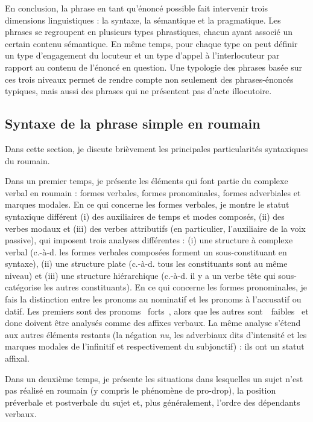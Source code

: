 En conclusion, la phrase en tant qu'énoncé possible fait intervenir trois dimensions linguistiques : la syntaxe, la sémantique et la pragmatique. Les phrases se regroupent en plusieurs types phrastiques, chacun ayant associé un certain contenu sémantique. En même temps, pour chaque type on peut définir un type d'engagement du locuteur et un type d'appel à l'interlocuteur par rapport au contenu de l'énoncé en question. Une typologie des phrases basée sur ces trois niveaux permet de rendre compte non seulement des phrases-énoncés typiques, mais aussi des phrases qui ne présentent pas d'acte illocutoire.

\subsection{Syntaxe de la phrase simple en roumain}
\label{bkm:Ref299354108}Dans cette section, je discute brièvement les principales particularités syntaxiques du roumain. 

Dans un premier temps, je présente les éléments qui font partie du complexe verbal en roumain : formes verbales, formes pronominales, formes adverbiales et marques modales. En ce qui concerne les formes verbales, je montre le statut syntaxique différent (i) des auxiliaires de temps et modes composés, (ii) des verbes modaux et (iii) des verbes attributifs (en particulier, l'auxiliaire de la voix passive), qui imposent trois analyses différentes : (i) une structure à complexe verbal (c.-à-d. les formes verbales composées forment un sous-constituant en syntaxe), (ii) une structure plate (c.-à-d. tous les constituants sont au même niveau) et (iii) une structure hiérarchique (c.-à-d. il y a un verbe tête qui sous-catégorise les autres constituants). En ce qui concerne les formes pronominales, je fais la distinction entre les pronoms au nominatif et les pronoms à l'accusatif ou datif. Les premiers sont des pronoms {\guillemotleft}~forts~{\guillemotright}, alors que les autres sont~{\guillemotleft}~faibles~{\guillemotright} et donc doivent être analysés comme des affixes verbaux. La même analyse s'étend aux autres éléments restants (la négation \textit{nu}, les adverbiaux dits d'intensité et les marques modales de l'infinitif et respectivement du subjonctif) : ils ont un statut affixal. 

Dans un deuxième temps, je présente les situations dans lesquelles un sujet n'est pas réalisé en roumain (y compris le phénomène de pro-drop), la position préverbale et postverbale du sujet et, plus généralement, l'ordre des dépendants verbaux. 

